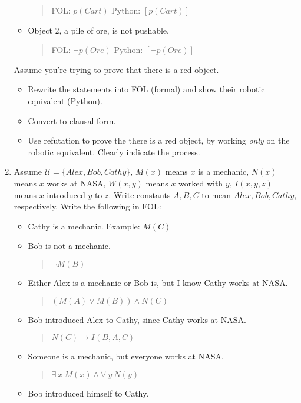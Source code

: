 \documentclass{article}
\begin{document}
\begin{enumerate}
\begin{itemize}
\begin{quote}
FOL: $p(Cart)$ \newline
Python: $[p(Cart)]$
\end{quote}
\item Object 2, a pile of ore, is not pushable. 
\begin{quote}
FOL:  $\neg p(Ore)$ \newline
Python: $[\neg p(Ore)]$
\end{quote}
\end{itemize}
Assume you're trying to prove that there is a red object. 
\begin{itemize}
\item Rewrite the statements into FOL (formal) and show their robotic equivalent (Python).
\item Convert to clausal form.
\item Use refutation to prove the there is a red object, by working {\it only} on the robotic equivalent.  Clearly indicate the process.
\end{itemize}
\item Assume $\mathcal{U} = \{Alex, Bob, Cathy\}$, $M(x)$ means $x$ is a mechanic, $N(x)$ means $x$ works at NASA, $W(x,y)$ means $x$ worked with $y$, $I(x,y,z)$ means $x$ introduced $y$ to $z$.  Write constants $A,B,C$ to mean $Alex, Bob, Cathy$, respectively. Write the following in FOL:
\begin{itemize}
\item Cathy is a mechanic. Example:  $M(C)$
\item Bob is not a mechanic.
\begin{quote}
$\neg M(B)$
\end{quote}
\item Either Alex is a mechanic or Bob is, but I know Cathy works at NASA.
\begin{quote}
$(M(A) \vee M(B)) \wedge N(C)$
\end{quote}
\item Bob introduced Alex to Cathy, since Cathy works at NASA.
\begin{quote}
$N(C) \rightarrow I(B, A, C)$
\end{quote}
\item Someone is a mechanic, but everyone works at NASA.
\begin{quote}
$\exists\ x\ M(x) \wedge \forall\ y\ N(y)$
\end{quote}
\item Bob introduced himself to Cathy.
\begin{quote}

\end{quote}
\end{itemize}
\end{enumerate}
\end{document}
